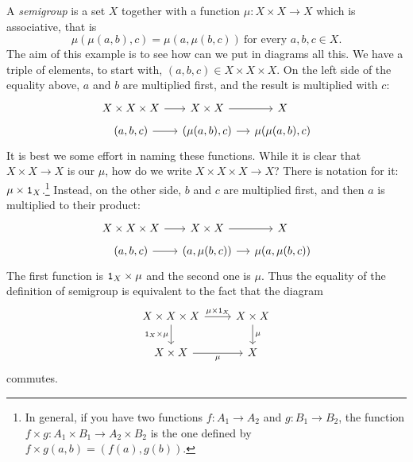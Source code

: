 \begin{example}
  A {\em semigroup} is a set \(X\) together with a function
  \(\mu : X \times X \to X\) which is associative, that is
  \[
    \mu(\mu(a, b), c) = \mu(a, \mu(b, c)) \ \text{for every } a, b, c
    \in X .
  \]
  The aim of this example is to see how can we put in diagrams all
  this. We have a triple of elements, to start with,
  \((a, b, c) \in X \times X \times X\). On the left side of the
  equality above, \(a\) and \(b\) are multiplied first, and the result
  is multiplied with \(c\):
  \[
    \begin{tikzcd}[row sep=tiny, column sep=small]
      X \times X \times X \ar[r] & X \times X \ar[r] & X \\
      (a, b, c) \ar[r] & (\mu(a, b), c) \ar[r] & \mu(\mu(a, b), c)
    \end{tikzcd}
  \]
  It is best we some effort in naming these functions. While it is
  clear that \(X \times X \to X\) is our \(\mu\), how do we write
  \(X \times X \times X \to X\)? There is notation for it:
  \(\mu \times \mathtt 1_X\).\footnote{In general, if you have two functions
    \(f : A_1 \to A_2\) and \(g : B_1 \to B_2\), the function
    \(f \times g : A_1 \times B_1 \to A_2 \times B_2\) is the one
    defined by \(f \times g (a, b) = (f(a), g(b))\).} Instead, on the
  other side, \(b\) and \(c\) are multiplied first, and then \(a\) is
  multiplied to their product:
  \[
    \begin{tikzcd}[row sep=tiny, column sep=small]
      X \times X \times X \ar[r] & X \times X \ar[r] & X \\
      (a, b, c) \ar[r] & (a, \mu(b, c)) \ar[r] & \mu(a, \mu(b, c))
    \end{tikzcd}
  \]
  The first function is \(\mathtt 1_X \times \mu\) and the second one is
  \(\mu\). Thus the equality of the definition of semigroup is
  equivalent to the fact that the diagram
  \[
    \begin{tikzcd}
      X \times X \times X \ar["{\mu \times \id_X}", r] \ar["{\id_X \times \mu}", d, swap] & X \times X \ar["\mu", d] \\
      X \times X \ar["\mu", r, swap] & X
    \end{tikzcd}
  \]
  commutes.
\end{example}

